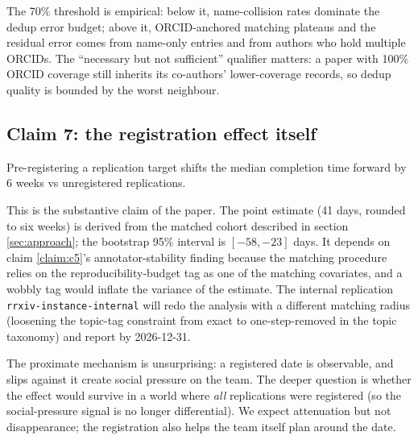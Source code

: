 \documentclass{rrxiv}
\begin{document}
The 70\% threshold is empirical: below it, name-collision rates dominate the dedup error budget; above it, ORCID-anchored matching plateaus and the residual error comes from name-only entries and from authors who hold multiple ORCIDs. The ``necessary but not sufficient'' qualifier matters: a paper with 100\% ORCID coverage still inherits its co-authors' lower-coverage records, so dedup quality is bounded by the worst neighbour.

\subsection*{Claim 7: the registration effect itself}
\begin{claim}[type=empirical, evidence=observation, confidence=0.6, rationale={Matched observational cohort with bootstrap interval excluding zero, but self-selection confound acknowledged and the dataset is a constructed worked example}, labels={worked-example, load-bearing, registration-effect}, title={The registration effect itself}]
\label{claim:c7}
Pre-registering a replication target shifts the median completion time forward by 6 weeks vs unregistered replications.
\end{claim}

This is the substantive claim of the paper. The point estimate (41 days, rounded to six weeks) is derived from the matched cohort described in section \ref{sec:approach}; the bootstrap 95\% interval is $[-58, -23]$ days. It depends on claim \ref{claim:c5}'s annotator-stability finding because the matching procedure relies on the reproducibility-budget tag as one of the matching covariates, and a wobbly tag would inflate the variance of the estimate. The internal replication \texttt{rrxiv-instance-internal} will redo the analysis with a different matching radius (loosening the topic-tag constraint from exact to one-step-removed in the topic taxonomy) and report by 2026-12-31.

\begin{rrxivremark}
The proximate mechanism is unsurprising: a registered date is observable, and slips against it create social pressure on the team. The deeper question is whether the effect would survive in a world where \emph{all} replications were registered (so the social-pressure signal is no longer differential). We expect attenuation but not disappearance; the registration also helps the team itself plan around the date.
\end{rrxivremark}
\end{document}
